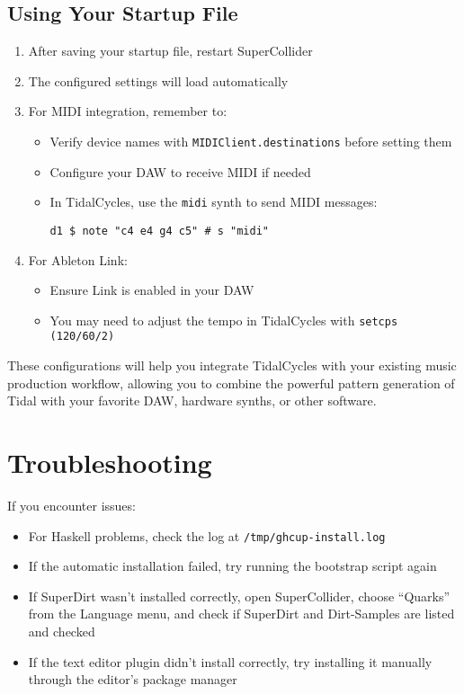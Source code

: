 \documentclass[11pt,a4paper]{article}
\begin{document}
\subsection{Using Your Startup File}

\begin{enumerate}
    \item After saving your startup file, restart SuperCollider
    \item The configured settings will load automatically
    \item For MIDI integration, remember to:
    \begin{itemize}
        \item Verify device names with \texttt{MIDIClient.destinations} before setting them
        \item Configure your DAW to receive MIDI if needed
        \item In TidalCycles, use the \texttt{midi} synth to send MIDI messages:
        \begin{lstlisting}[style=haskell]
d1 $ note "c4 e4 g4 c5" # s "midi"
        \end{lstlisting}
    \end{itemize}

    \item For Ableton Link:
    \begin{itemize}
        \item Ensure Link is enabled in your DAW
        \item You may need to adjust the tempo in TidalCycles with \texttt{setcps (120/60/2)}
    \end{itemize}
\end{enumerate}

These configurations will help you integrate TidalCycles with your existing music production workflow, allowing you to combine the powerful pattern generation of Tidal with your favorite DAW, hardware synths, or other software.

\section{Troubleshooting}

If you encounter issues:

\begin{itemize}
    \item For Haskell problems, check the log at \texttt{/tmp/ghcup-install.log}
    \item If the automatic installation failed, try running the bootstrap script again
    \item If SuperDirt wasn't installed correctly, open SuperCollider, choose ``Quarks'' from the Language menu, and check if SuperDirt and Dirt-Samples are listed and checked
    \item If the text editor plugin didn't install correctly, try installing it manually through the editor's package manager
\end{itemize}
\end{document}
